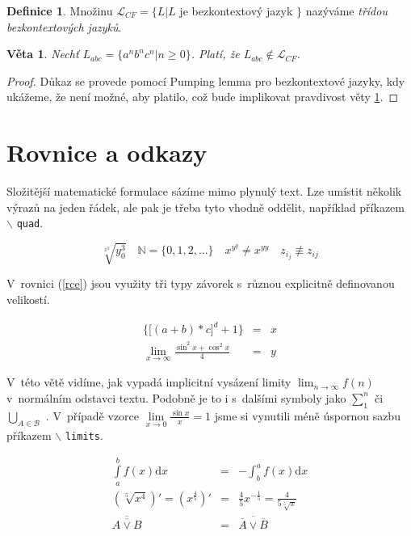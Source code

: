 \documentclass[11pt,a4paper,twocolumn]{article}
\theoremstyle{plain}
\theoremstyle{definition}
\newtheorem{bg}[theorem]{Definice}
\theoremstyle{plain}
\newtheorem{pov}{Věta}
\begin{document}
      \begin{bg}
        Množinu $\mathcal{L}_{CF} = \{L|L$ je bezkontextový jazyk $\}$ nazýváme
        \emph{třídou bezkontextových jazyků}.
      \end{bg}

      \begin{pov} \label{vetajedna}
        Nechť $L_{abc} = \{a^{n}b^{n}c^{n}|n \geq 0 \}$. Platí, že $L_{abc}
        \notin \mathcal{L}_{CF}$.
      \end{pov}

      \begin{proof}
        Důkaz se provede pomocí Pumping lemma pro bezkontextové jazyky, kdy
        ukážeme, že není možné, aby platilo, což bude implikovat pravdivost
        věty \ref{vetajedna}.
      \end{proof}

  \section{Rovnice a odkazy}

    Složitější matematické formulace sázíme mimo plynulý text. Lze umístit
    několik výrazů na jeden řádek, ale pak je třeba tyto vhodně oddělit,
    například příkazem $\backslash$ \texttt{quad}. 

    $$ \sqrt[x^{2}]{y^{3}_{0}} \quad \mathbb{N} = \{0,1,2,...\} \quad x^{y^{y}}
    \neq x^{yy} \quad z_{i_{j}} \not \equiv z_{ij} $$

    V~rovnici (\ref{rce}) jsou využity tři typy závorek s~různou explicitně
    definovanou velikostí.
    
    \begin{eqnarray} \label{rce}
      \bigg\{\Big[(a+b)*c\Big]^{d}+1\bigg\} & = & x \\
      \lim_{x \to \infty}\frac{\sin^{2}x+\cos^{2}x}{4} &= & y \nonumber
    \end{eqnarray}

    V~této větě vidíme, jak vypadá implicitní vysázení limity
    $\lim_{n\rightarrow\infty} f(n)$ v~normálním odstavci textu. Podobně je to i
    s~dalšími symboly jako $\sum^{n}_{1}$ či $\bigcup_{A\in \mathcal{B}}$ .
    V~případě vzorce $\lim\limits_{x \to 0}\frac{\sin x}{x}=1$ jsme si vynutili
    méně úspornou sazbu příkazem $\backslash$ \texttt{limits}.

    \setcounter{equation}{1}

    \begin{eqnarray}
      \int\limits^{b}_{a} f(x)\mathrm{d}x & = & - \int^{a}_{b}f(x)\mathrm{d}x \\
      (\sqrt[5]{x^{4}})' = (x^{\frac{4}{5}})' & = & \frac{4}{5}x^{-\frac{1}{5}} 
      = \frac{4}{5\sqrt[5]{x}} \\
      \overline{\overline{A \vee B}} & = & \overline{\overline{A} \vee
      \overline{B}}
    \end{eqnarray}
\end{document}
